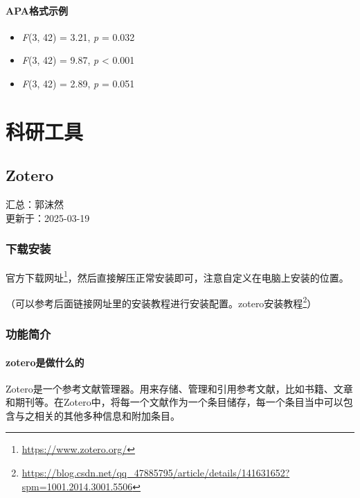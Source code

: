 \documentclass[]{ctexbook}
\providecommand{\tightlist}{%
  \setlength{\itemsep}{0pt}\setlength{\parskip}{0pt}}
\renewcommand{\href}[2]{#2\footnote{\url{#1}}}
\theoremstyle{definition}
\theoremstyle{definition}
\theoremstyle{definition}
\theoremstyle{definition}
\theoremstyle{remark}
\begin{document}
\subsection{APA格式示例}\label{apaux683cux5f0fux793aux4f8b}

\begin{itemize}
\tightlist
\item
  \emph{F}(3, 42) = 3.21, \emph{p} = 0.032
\item
  \emph{F}(3, 42) = 9.87, \emph{p} \textless{} 0.001
\item
  \emph{F}(3, 42) = 2.89, \emph{p} = 0.051
\end{itemize}

\part{科研工具}\label{part-ux79d1ux7814ux5de5ux5177}

\chapter{Zotero}\label{zotero}

汇总：郭沫然\\
更新于：2025-03-19

\section{下载安装}\label{ux4e0bux8f7dux5b89ux88c5}

\href{https://www.zotero.org/}{官方下载网址}，然后直接解压正常安装即可，注意自定义在电脑上安装的位置。

（可以参考后面链接网址里的安装教程进行安装配置。\href{https://blog.csdn.net/qq_47885795/article/details/141631652?spm=1001.2014.3001.5506}{zotero安装教程}）

\section{功能简介}\label{ux529fux80fdux7b80ux4ecb}

\subsection{zotero是做什么的}\label{zoteroux662fux505aux4ec0ux4e48ux7684}

Zotero是一个参考文献管理器。用来存储、管理和引用参考文献，比如书籍、文章和期刊等。在Zotero中，将每一个文献作为一个条目储存，每一个条目当中可以包含与之相关的其他多种信息和附加条目。
\end{document}
